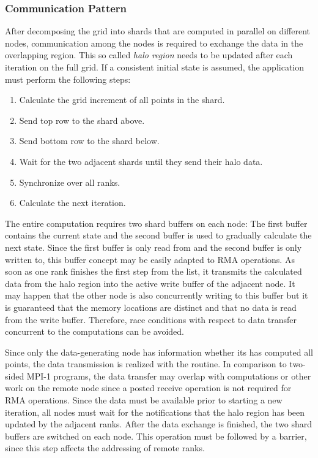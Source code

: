 \subsubsection*{Communication Pattern}

After decomposing the grid into shards that are computed in parallel on different nodes, communication among the nodes is required to exchange the data in the overlapping region. This so called \emph{halo region} needs to be updated after each iteration on the full grid. If a consistent initial state is assumed, the application must perform the following steps:
\begin{enumerate}
	\item Calculate the grid increment of all points in the shard.
	\item Send top row to the shard above.
	\item Send bottom row to the shard below.
	\item Wait for the two adjacent shards until they send their halo data.
	\item Synchronize over all ranks.
	\item Calculate the next iteration.
\end{enumerate} 

The entire computation requires two shard buffers on each node: The first buffer contains the current state and the second buffer is used to gradually calculate the next state. Since the first buffer is only read from and the second buffer is only written to, this buffer concept may be easily adapted to \ac{RMA} operations. As soon as one rank finishes the first step from the list, it transmits the calculated data from the halo region into the active write buffer of the adjacent node. It may happen that the other node is also concurrently writing to this buffer but it is guaranteed that the memory locations are distinct and that no data is read from the write buffer. Therefore, race conditions with respect to data transfer concurrent to the computations can be avoided.

Since only the data-generating node has information whether its has computed all points, the data transmission is realized with the \gaspiWriteNotify routine. In comparison to two-sided \ac{MPI}-1 programs, the data transfer may overlap with computations or other work on the remote node since a posted receive operation is not required for \ac{RMA} operations. Since the data must be available prior to starting a new iteration, all nodes must wait for the notifications that the halo region has been updated by the adjacent ranks. After the data exchange is finished, the two shard buffers are switched on each node. This operation must be followed by a barrier, since this step affects the addressing of remote ranks. 

